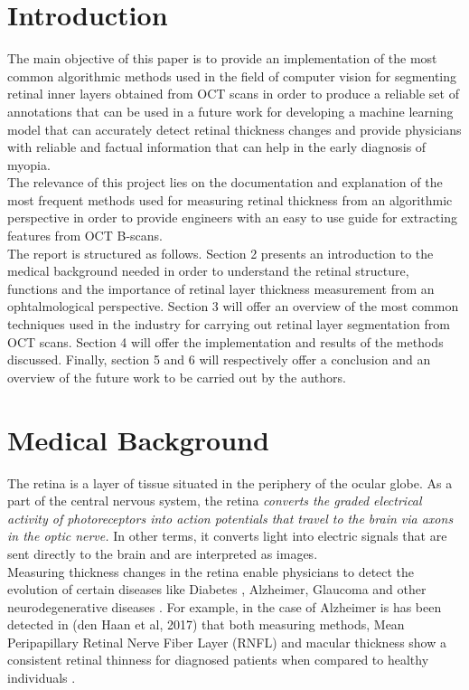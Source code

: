 \documentclass[12pt,a4paper]{scrartcl}
\begin{document}
\section{Introduction}\label{s:introduction}
The main objective of this paper is to provide an implementation of the most common algorithmic methods used in the field of computer vision for segmenting retinal inner layers obtained from OCT scans in order to produce a reliable set of annotations that can be used in a future work for developing a machine learning model that can accurately detect retinal thickness changes and provide physicians with reliable and factual information that can help in the early diagnosis of myopia. \\

The relevance of this project lies on the documentation and explanation of the most frequent methods used for measuring retinal thickness from an algorithmic perspective in order to provide engineers with an easy to use guide for extracting features from OCT B-scans. \\

The report is structured as follows. Section 2 presents an introduction to the medical background needed in order to understand the retinal structure, functions and the importance of retinal layer thickness measurement from an ophtalmological perspective. Section 3 will offer an overview of the most common techniques used in the industry for carrying out retinal layer segmentation from OCT scans. Section 4 will offer the implementation and results of the methods discussed. Finally, section 5 and 6 will respectively offer a conclusion and an overview of the future work to be carried out by the authors.  \\

\section{Medical Background}\label{s:medical_background}

The retina is a layer of tissue situated in the periphery of the ocular globe. As a part of the central nervous system, the retina \textit{converts the graded electrical activity of photoreceptors into action potentials that travel to the brain via axons in the optic nerve.}\cite{purves2001} In other terms, it converts light into electric signals that are sent directly to the brain and are interpreted as images. \\

Measuring thickness changes in the retina enable physicians to detect the evolution of certain diseases like Diabetes \cite{Jiang2018}, Alzheimer, Glaucoma and other neurodegenerative diseases \cite{DENHAAN2017162}. For example, in the case of Alzheimer is has been detected in (den Haan et al, 2017) that both measuring methods, Mean Peripapillary Retinal Nerve Fiber Layer (RNFL) and macular thickness show a consistent retinal thinness for diagnosed patients when compared to healthy individuals \cite{DENHAAN2017162}.\\
\end{document}
